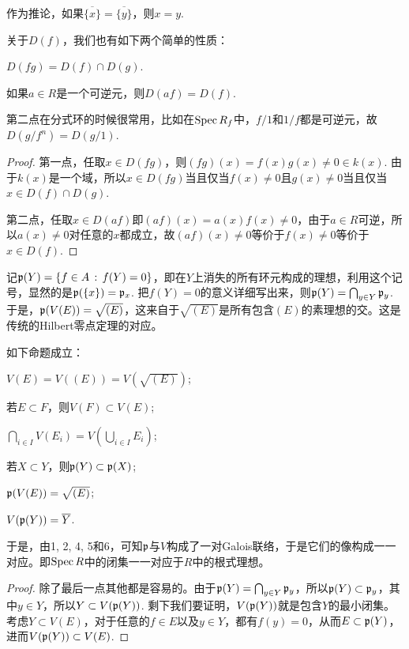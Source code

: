 作为推论，如果$\overline{\{x\}}=\overline{\{y\}}$，则$x=y$.

\begin{pro}
关于$D(f)$，我们也有如下两个简单的性质：
\begin{compactenum}[~~~1.]
\item $D(fg)=D(f)\cap D(g)$.
\item 如果$a\in R$是一个可逆元，则$D(af)=D(f)$.
\end{compactenum}
\end{pro}

第二点在分式环的时候很常用，比如在$\operatorname{Spec} R_f$中，$f/1$和$1/f$都是可逆元，故$D(g/f^n)=D(g/1)$.

\begin{proof}
第一点，任取$x\in D(fg)$，则$(fg)(x)=f(x)g(x)\neq 0\in k(x)$. 由于$k(x)$是一个域，所以$x\in D(fg)$当且仅当$f(x)\neq 0$且$g(x)\neq 0$当且仅当$x\in D(f)\cap D(g)$.

第二点，任取$x\in D(af)$即$(af)(x)=a(x)f(x)\neq 0$，由于$a\in R$可逆，所以$a(x)\neq 0$对任意的$x$都成立，故$(af)(x)\neq 0$等价于$f(x)\neq 0$等价于$x\in D(f)$.
\end{proof}

记$\mathfrak{p}(Y)=\{f\in A\,:\, f(Y)=0\}$，即在$Y$上消失的所有环元构成的理想，利用这个记号，显然的是$\mathfrak{p}(\{x\})=\mathfrak{p}_x$. 把$f(Y)=0$的意义详细写出来，则$\mathfrak{p}(Y)=\bigcap_{y\in Y}\mathfrak{p}_y$. 于是，$\mathfrak{p}(V(E))=\sqrt{(E)}$，这来自于$\sqrt{(E)}$是所有包含$(E)$的素理想的交。这是传统的Hilbert零点定理的对应。

\begin{pro}如下命题成立：
\begin{compactenum}[~~~1.]
\item $V(E)=V((E))=V(\sqrt{(E)})$;
\item 若$E\subset F$，则$V(F)\subset V(E)$;
\item $\bigcap_{i\in I}V(E_i)=V(\bigcup_{i\in I}E_i)$;
\item 若$X\subset Y$，则$\mathfrak{p}(Y) \subset \mathfrak{p}(X)$;
\item $\mathfrak{p}(V(E))=\sqrt{(E)}$;
\item $V(\mathfrak{p}(Y))=\overline{Y}$.
\end{compactenum}
\end{pro}

于是，由1, 2, 4, 5和6，可知$\mathfrak{p}$与$V$构成了一对Galois联络，于是它们的像构成一一对应。即$\operatorname{Spec} R$中的闭集一一对应于$R$中的根式理想。

\begin{proof}

除了最后一点其他都是容易的。由于$\mathfrak{p}(Y)=\bigcap_{y\in Y}\mathfrak{p}_y$，所以$\mathfrak{p}(Y) \subset \mathfrak{p}_y$，其中$y\in Y$，所以$Y\subset V(\mathfrak{p}(Y))$. 剩下我们要证明，$V(\mathfrak{p}(Y))$就是包含$Y$的最小闭集。考虑$Y\subset V(E)$，对于任意的$f\in E$以及$y\in Y$，都有$f(y)=0$，从而$E\subset \mathfrak{p}(Y)$，进而$V(\mathfrak{p}(Y))\subset V(E)$. 
\end{proof}

